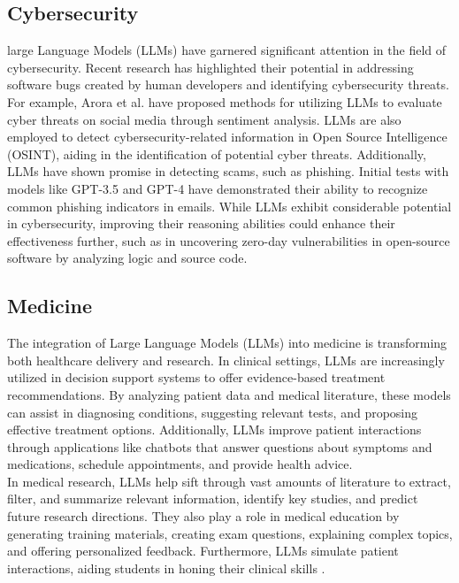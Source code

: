 \subsection{Cybersecurity}
large Language Models (LLMs) have garnered significant attention in the field of cybersecurity. Recent research has highlighted their potential in addressing software bugs created by human developers and identifying cybersecurity threats. For example, Arora et al. have proposed methods for utilizing LLMs to evaluate cyber threats on social media through sentiment analysis. LLMs are also employed to detect cybersecurity-related information in Open Source Intelligence (OSINT), aiding in the identification of potential cyber threats. Additionally, LLMs have shown promise in detecting scams, such as phishing. Initial tests with models like GPT-3.5 and GPT-4 have demonstrated their ability to recognize common phishing indicators in emails. While LLMs exhibit considerable potential in cybersecurity, improving their reasoning abilities could enhance their effectiveness further, such as in uncovering zero-day vulnerabilities in open-source software by analyzing logic and source code\cite{helwe2024}.
\subsection{Medicine}
The integration of Large Language Models (LLMs) into medicine is transforming both healthcare delivery and research. In clinical settings, LLMs are increasingly utilized in decision support systems to offer evidence-based treatment recommendations. By analyzing patient data and medical literature, these models can assist in diagnosing conditions, suggesting relevant tests, and proposing effective treatment options. Additionally, LLMs improve patient interactions through applications like chatbots that answer questions about symptoms and medications, schedule appointments, and provide health advice.\\
In medical research, LLMs help sift through vast amounts of literature to extract, filter, and summarize relevant information, identify key studies, and predict future research directions. They also play a role in medical education by generating training materials, creating exam questions, explaining complex topics, and offering personalized feedback. Furthermore, LLMs simulate patient interactions, aiding students in honing their clinical skills \cite{Naveed2024}.

